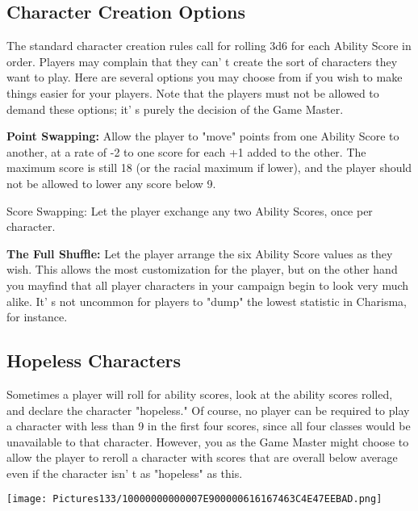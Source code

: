 \documentclass[a4paper,twoside,openany,10pt]{book}
\begin{document}
\begin{multicols}{2}


\subsection{Character Creation Options}\label{character-creation-options}

The standard character creation rules call for rolling 3d6 for each Ability Score in order. Players may complain that they can' t create the sort of characters they want to play. Here are several options you may choose from if you wish to make things easier for your players. Note that the players must not be allowed to demand these options; it' s purely the decision of the Game Master.

\textbf{Point Swapping:} Allow the player to "move" points from one Ability Score to another, at a rate of -2 to one score for each +1 added to the other. The maximum score is still 18 (or the racial maximum if lower), and the player should not be allowed to lower any score below 9. 

Score Swapping: Let the player exchange any two Ability Scores, once per character.

\textbf{The Full Shuffle:} Let the player arrange the six Ability Score values as they wish. This allows the most customization for the player, but on the other hand you mayfind that all player characters in your  campaign begin to look very much alike. It' s not uncommon for players to "dump" the lowest statistic in Charisma, for instance.

\subsection{Hopeless Characters}\label{hopeless-characters}

Sometimes a player will roll for ability scores, look at the ability scores rolled, and declare the character "hopeless." Of course, no player can be required to play a character with less than 9 in the first four scores, since all four classes would be unavailable to that character. However, you as the Game Master might choose to allow the player to reroll a character with scores that are overall below average even if the character isn' t as "hopeless" as this.

\begin{center}

\texttt{[image: Pictures133/10000000000007E900000616167463C4E47EEBAD.png]}  
\end{center}


\end{multicols}
\end{document}
